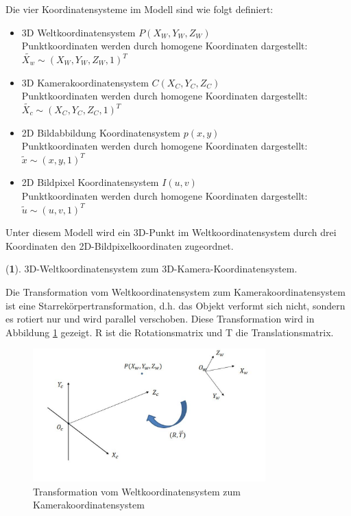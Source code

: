 Die vier Koordinatensysteme im Modell sind wie folgt definiert:

\begin{itemize}
	\item 3D Weltkoordinatensystem $P(X_W,Y_W,Z_W)$ \\
	Punktkoordinaten werden durch homogene Koordinaten dargestellt: $\widetilde{X_w}\sim(X_W,Y_W,Z_W,1)^T$
	\item 3D Kamerakoordinatensystem $C(X_C,Y_C,Z_C)$\\
	Punktkoordinaten werden durch homogene Koordinaten dargestellt: $\widetilde{X_c}\sim(X_C,Y_C,Z_C,1)^T$
	\item 2D Bildabbildung Koordinatensystem $p(x,y)$\\
	Punktkoordinaten werden durch homogene Koordinaten dargestellt: $\widetilde{x}\sim(x,y,1)^T$
	\item 2D Bildpixel Koordinatensystem $I(u,v)$\\
	Punktkoordinaten werden durch homogene Koordinaten dargestellt: $\widetilde{u}\sim(u,v,1)^T$
\end{itemize}

Unter diesem Modell wird ein 3D-Punkt im Weltkoordinatensystem durch drei Koordinaten den 2D-Bildpixelkoordinaten zugeordnet.

(\textbf{1}). 3D-Weltkoordinatensystem zum 3D-Kamera-Koordinatensystem.

Die Transformation vom Weltkoordinatensystem zum Kamerakoordinatensystem ist eine Starrekörpertransformation, d.h. das Objekt verformt sich nicht, sondern es rotiert nur und wird parallel verschoben. Diese Transformation wird in Abbildung \ref{fig:WzuC} gezeigt. R ist die Rotationsmatrix und T die Translationsmatrix.

\begin{figure}[htb]
 \centering 
 \includegraphics[keepaspectratio,width=0.8\textwidth]{images/3_Ersteverfahren/Kamera/WzuC.pdf}
 \caption{Transformation vom Weltkoordinatensystem zum Kamerakoordinatensystem}
 \label{fig:WzuC}
\end{figure} 

